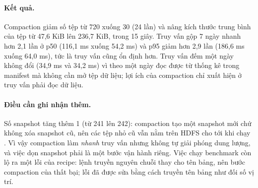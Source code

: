 \paragraph{Kết quả.} Compaction giảm số tệp từ 720 xuống 30 (24 lần) và nâng kích thước trung bình của tệp từ 47,6 KiB lên 236,7 KiB, trong 15 giây. Truy vấn gộp 7 ngày nhanh hơn 2,1 lần ở p50 (116,1 ms xuống 54,2 ms) và p95 giảm hơn 2,9 lần (186,6 ms xuống 64,0 ms), tức là truy vấn cũng ổn định hơn. Truy vấn đếm một ngày không đổi (34,9 ms và 34,2 ms) vì  theo một ngày đọc được từ thống kê trong manifest mà không cần mở tệp dữ liệu; lợi ích của compaction chỉ xuất hiện ở truy vấn phải đọc dữ liệu.

\paragraph{Điều cần ghi nhận thêm.} Số snapshot tăng thêm 1 (từ 241 lên 242): compaction tạo một snapshot mới chứ không xóa snapshot cũ, nên các tệp nhỏ cũ vẫn nằm trên HDFS cho tới khi chạy . Vì vậy compaction làm \emph{nhanh} truy vấn nhưng không tự giải phóng dung lượng, và việc dọn snapshot phải là một bước vận hành riêng. Việc chạy benchmark còn lộ ra một lỗi của recipe: lệnh  truyền nguyên chuỗi  thay cho tên bảng, nên bước compaction của  thất bại; lỗi đã được sửa bằng cách truyền tên bảng như đối số vị trí.
